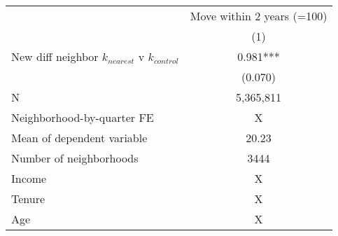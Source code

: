 \begin{tabular}{lc}
\toprule
 & Move within 2 years (=100) \\ 
\cmidrule(lr){2-2}
  & (1) \\ 
\midrule
New diff neighbor $k_{nearest}$ v $k_{control}$ & 0.981*** \\ 
 & (0.070) \\ 
 \midrule
N & 5,365,811 \\ 
Neighborhood-by-quarter FE & X \\ 
Mean of dependent variable & 20.23 \\ 
Number of neighborhoods & 3444 \\ 
Income & X \\ 
Tenure & X \\ 
Age & X \\ 
\bottomrule
\end{tabular}